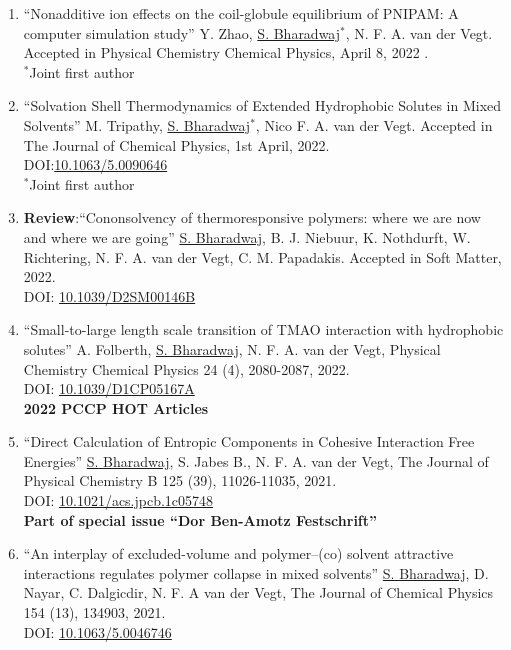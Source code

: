 \documentclass[a4paper,14pt]{article}
\begin{document}
\begin{enumerate}
\item
\enquote{Nonadditive ion effects on the coil-globule equilibrium of PNIPAM: A computer simulation study} Y. Zhao, \underline{S. Bharadwaj}$^{\ast}$, N. F. A. van der Vegt. Accepted in Physical Chemistry Chemical Physics, April 8, 2022 .\\
$^{\ast}$Joint first author
\item
\enquote{Solvation Shell Thermodynamics of Extended Hydrophobic Solutes in
Mixed Solvents} M. Tripathy, \underline{S. Bharadwaj}$^{\ast}$, Nico F. A. van
der Vegt. Accepted in The Journal of Chemical Physics, 1st April, 2022.\\
DOI:\href{https://doi.org/10.1063/5.0090646}{10.1063/5.0090646}\\
$^{\ast}$Joint first author
\item
\textbf{Review}:\enquote{Cononsolvency of thermoresponsive polymers: where we are now and where we are going} \underline{S. Bharadwaj}, B. J. Niebuur, K. Nothdurft, W. Richtering, N. F. A. van der Vegt, C. M. Papadakis. Accepted in Soft Matter, 2022.\\
DOI: \href{https://doi.org/10.1039/D2SM00146B}{10.1039/D2SM00146B}
\item
\enquote{Small-to-large length scale transition of TMAO interaction with hydrophobic solutes}
A. Folberth, \underline{S. Bharadwaj}, N. F. A. van der Vegt,
Physical Chemistry Chemical Physics 24 (4), 2080-2087, 2022. \\DOI: \href{https://doi.org/10.1039/D1CP05167A}{10.1039/D1CP05167A}
\\ 
\textbf{2022 PCCP HOT Articles}
\item
\enquote{Direct Calculation of Entropic Components in Cohesive Interaction Free Energies}
\underline{S. Bharadwaj}, S. Jabes B., N. F. A.  van der Vegt,
The Journal of Physical Chemistry B 125 (39), 11026-11035, 2021.\\
DOI: \href{https://doi.org/10.1021/acs.jpcb.1c05748}{10.1021/acs.jpcb.1c05748}\\
\textbf{Part of special issue \enquote{Dor Ben-Amotz Festschrift}}
\item
\enquote{An interplay of excluded-volume and polymer–(co) solvent attractive interactions regulates polymer collapse in mixed solvents}
\underline{S. Bharadwaj}, D. Nayar, C. Dalgicdir, N. F. A van der Vegt,
The Journal of Chemical Physics 154 (13), 134903, 2021.\\
DOI: \href{https://doi.org/10.1063/5.0046746}{10.1063/5.0046746}

\end{enumerate}
\end{document}
